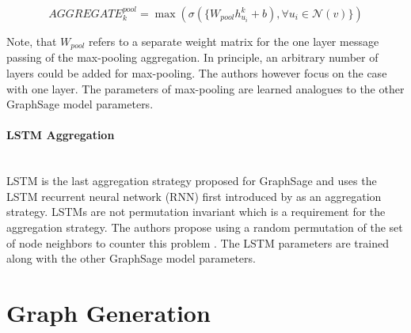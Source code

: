 	\begin{equation}
		AGGREGATE_{k}^{pool} = \max\left(\sigma(\{W_{pool}h_{u_{i}}^{k} +
		b),\forall u_{i} \in \mathcal{N}(v)\}\right)
	\end{equation}

	\noindent Note, that $W_{pool}$ refers to a separate weight matrix for the
	one layer message passing of the max-pooling aggregation. In principle, an 
	arbitrary number of layers could be added for max-pooling. The authors 
	\cite{hamilton2017inductive} however focus on the case with one layer. The
	parameters of max-pooling are learned analogues to the other GraphSage
	model parameters. \\ 

	\paragraph{LSTM Aggregation} \mbox{}\\
	\noindent LSTM is the last aggregation strategy proposed for GraphSage and
	uses the LSTM recurrent neural network (RNN) first introduced by
	\cite{hochreiter1997long} as an aggregation strategy. LSTMs are not
	permutation invariant which is a requirement for the aggregation strategy.
	The authors propose using a random permutation of the set of node neighbors 
	to counter this problem \citep[p. 5]{hamilton2017inductive}. The LSTM
	parameters are trained along with the other GraphSage model parameters.  

	\section{Graph Generation}
	\label{section:theory_graphgen} 

